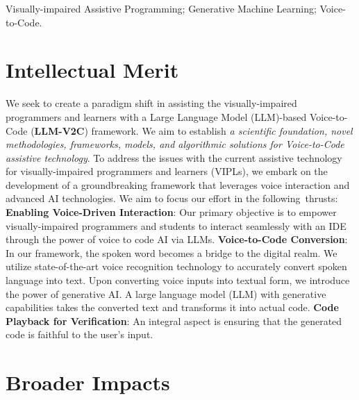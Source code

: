 \documentclass[11pt]{article}
\begin{document}

 Visually-impaired Assistive Programming; Generative
Machine Learning; Voice-to-Code.

\section{Intellectual Merit}

We seek to create a paradigm shift in assisting the visually-impaired
programmers and learners with a Large Language Model
(LLM)-based Voice-to-Code ({\bf LLM-V2C}) framework. We aim to establish {\em
  a scientific foundation, novel methodologies, frameworks, models,
  and algorithmic solutions for Voice-to-Code assistive technology}.
%
To address the issues with the current assistive technology for
visually-impaired programmers and learners (VIPLs), we embark on the
development of a groundbreaking framework that leverages voice
interaction and advanced AI technologies. We aim to focus our effort
in the following~thrusts: {\bf Enabling Voice-Driven Interaction}: Our
primary objective is to empower visually-impaired programmers and
students to interact seamlessly with an IDE through the power of voice
to code AI via LLMs. {\bf Voice-to-Code Conversion}: In our framework,
the spoken word becomes a bridge to the digital realm. We utilize
state-of-the-art voice recognition technology to accurately convert
spoken language into text. Upon converting voice inputs into textual
form, we introduce the power of generative AI. A large language model
(LLM) with generative capabilities takes the converted text and
transforms it into actual code. {\bf Code Playback for Verification}:
An integral aspect is ensuring that the generated code is faithful to
the user's input.
 
\section{Broader Impacts}
\end{document}
